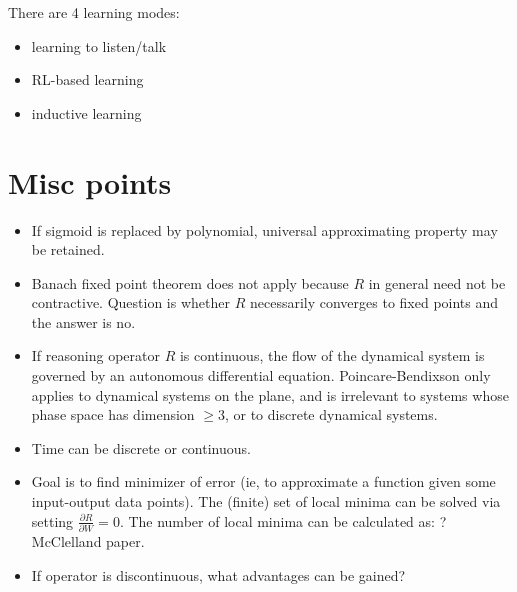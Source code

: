 \documentclass[orivec]{llncs}
\begin{document}

There are 4 learning modes:
\begin{itemize}
\item learning to listen/talk
\item RL-based learning
\item inductive learning
\end{itemize}

\section{Misc points}

\begin{itemize}
\item If sigmoid is replaced by polynomial, universal approximating property may be retained.

\item Banach fixed point theorem does not apply because $R$ in general need not be contractive.  Question is whether $R$ necessarily converges to fixed points and the answer is no.

\item If reasoning operator $R$ is continuous, the flow of the dynamical system is governed by an autonomous differential equation.  Poincare-Bendixson only applies to dynamical systems on the plane, and is irrelevant to systems whose phase space has dimension $\geq 3$, or to discrete dynamical systems.

\item Time can be discrete or continuous.

\item Goal is to find minimizer of error (ie, to approximate a function given some input-output data points).  The (finite) set of local minima can be solved via setting $\frac{\partial R}{\partial W} = 0$.  The number of local minima can be calculated as: ?  McClelland paper.

\item If operator is discontinuous, what advantages can be gained?
\end{itemize}
\end{document}
